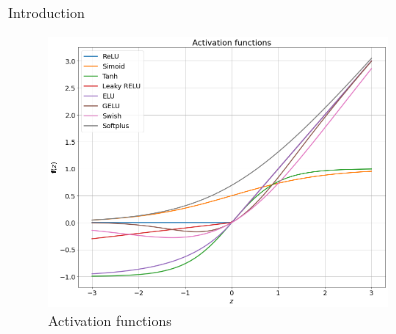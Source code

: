 \documentclass[10pt]{beamer}
\theoremstyle{remark}
\theoremstyle{definition}
\begin{document}
\begin{frame}[allowframebreaks]{Introduction}
	\begin{figure}
		\centering
		\includegraphics[width=9cm]{activation_functions.png}
		\caption{Activation functions}
	\end{figure}
\end{frame}
\end{document}
